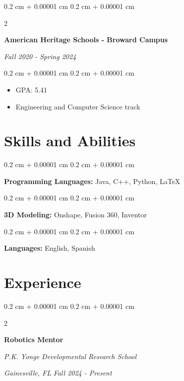 \documentclass[10pt, letterpaper]{article}
\newenvironment{highlights}{
    \begin{itemize}[
        topsep=0.10 cm,
        parsep=0.10 cm,
        partopsep=0pt,
        itemsep=0pt,
        leftmargin=0.4 cm + 10pt
    ]
}{
    \end{itemize}
} %
\newenvironment{onecolentry}{
    \begin{adjustwidth}{
        0.2 cm + 0.00001 cm
    }{
        0.2 cm + 0.00001 cm
    }
}{
    \end{adjustwidth}
} %
\newenvironment{twocolentry}[2][]{
    \onecolentry
    \def\secondColumn{#2}
    \setcolumnwidth{\fill, 4.5 cm}
    \begin{paracol}{2}
}{
    \switchcolumn \raggedleft \secondColumn
    \end{paracol}
    \endonecolentry
} %
\begin{document}
        \begin{twocolentry}{
            
            
            \textit{Fall 2020 - Spring 2024}}
                \textbf{American Heritage Schools - Broward Campus}
    
            \end{twocolentry}
    
            \vspace{0.10 cm}
            \begin{onecolentry}
                \begin{highlights}
                    \item GPA: 5.41
                    \item Engineering and Computer Science track
                \end{highlights}
            \end{onecolentry}
    
        
    \section{Skills and Abilities}

        \begin{onecolentry}
            \textbf{Programming Languages:} Java, C++, Python, LaTeX
        \end{onecolentry}
        
        \begin{onecolentry}
            \textbf{3D Modeling:} Onshape, Fusion 360, Inventor  
        \end{onecolentry}

        \begin{onecolentry}
            \textbf{Languages:} English, Spanish
        \end{onecolentry}

    \section{Experience}
        \begin{twocolentry}{
        \textit{Gainesville, FL}    
        \textit{Fall 2024 - Present}}
            \textbf{Robotics Mentor}
            
            \textit{P.K. Yonge Developmental Research School}
        \end{twocolentry}
\end{document}
